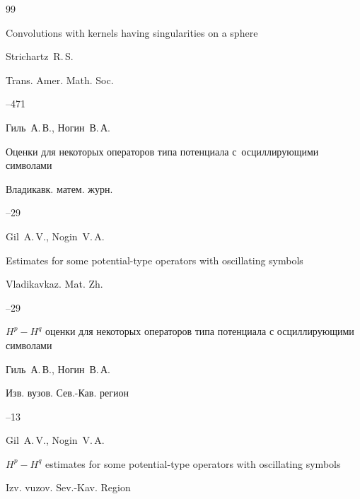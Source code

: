 \begin{thebibliography}{99}




\paper Convolutions with kernels having singularities on a sphere

\by Strichartz~R.\,S.

\jour Trans. Amer. Math. Soc.



--471








\by  Гиль~А.\,В., Ногин~В.\,А.

\paper Оценки для некоторых операторов типа потенциала с~осциллирующими символами

\jour Владикавк. матем. журн.




--29

\misctransl

\by Gil~A.\,V., Nogin~V.\,A.

\paper Estimates for some potential-type operators with oscillating symbols

\jour Vladikavkaz. Mat. Zh.




--29




\paper  $H^p-H^q$ оценки для некоторых операторов типа потенциала с осциллирующими символами

\by Гиль~А.\,В., Ногин~В.\,А.

\jour Изв. вузов. Сев.-Кав. регион



--13

\misctransl

\by Gil~A.\,V., Nogin~V.\,A.

\paper $H^p-H^q$ estimates for some potential-type operators with oscillating symbols

\jour Izv. vuzov. Sev.-Kav. Region


\end{thebibliography}
